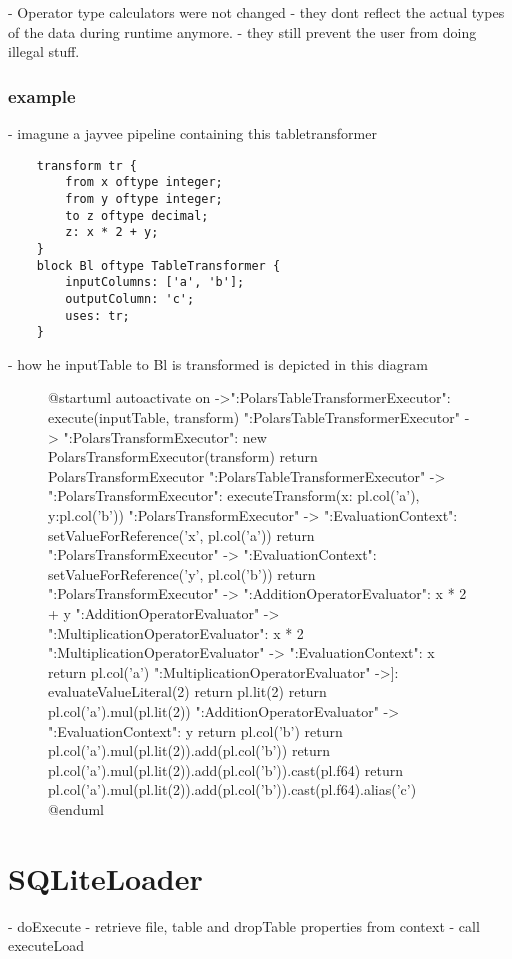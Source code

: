 - Operator type calculators were not changed
- they dont reflect the actual types of the data during runtime anymore.
- they still prevent the user from doing illegal stuff.


\subsubsection{example}
- imagune a jayvee pipeline containing this tabletransformer \
\begin{verbatim}
	transform tr {
		from x oftype integer;
		from y oftype integer;
		to z oftype decimal;
		z: x * 2 + y;
	}
	block Bl oftype TableTransformer {
		inputColumns: ['a', 'b'];
		outputColumn: 'c';
		uses: tr;
	}
\end{verbatim}
- how he inputTable to Bl is transformed is depicted in this diagram
\begin{figure}
	\begin{plantuml}
		@startuml
		autoactivate on
		->":PolarsTableTransformerExecutor": execute(inputTable, transform)
		":PolarsTableTransformerExecutor" -> ":PolarsTransformExecutor": new PolarsTransformExecutor(transform)
		return PolarsTransformExecutor
		":PolarsTableTransformerExecutor" -> ":PolarsTransformExecutor": executeTransform({x: pl.col('a'), y:pl.col('b')})
		":PolarsTransformExecutor" -> ":EvaluationContext": setValueForReference('x', pl.col('a'))
		return
		":PolarsTransformExecutor" -> ":EvaluationContext": setValueForReference('y', pl.col('b'))
		return
		":PolarsTransformExecutor" -> ":AdditionOperatorEvaluator": x * 2 + y
		":AdditionOperatorEvaluator" -> ":MultiplicationOperatorEvaluator": x * 2
		":MultiplicationOperatorEvaluator" -> ":EvaluationContext": x
		return pl.col('a')
		":MultiplicationOperatorEvaluator" ->]: evaluateValueLiteral(2)
		return pl.lit(2)
		return pl.col('a').mul(pl.lit(2))
		":AdditionOperatorEvaluator" -> ":EvaluationContext": y
		return pl.col('b')
		return pl.col('a').mul(pl.lit(2)).add(pl.col('b'))
		return pl.col('a').mul(pl.lit(2)).add(pl.col('b')).cast(pl.f64)
		return \n pl.col('a').mul(pl.lit(2)).add(pl.col('b')).cast(pl.f64).alias('c')
		@enduml
	\end{plantuml}
	\caption{}
	\label{fig:uml:epr:example}
\end{figure}




\section{SQLiteLoader}
- doExecute
- retrieve file, table and dropTable properties from context
- call executeLoad

